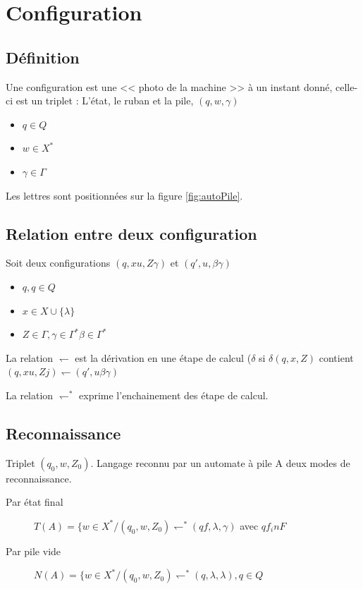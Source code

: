 	\section{Configuration}
	\subsection{Définition}
	Une configuration est une << photo de la machine >> à un instant donné, celle-ci est un triplet : L'état, le ruban et la pile, $(q, w, \gamma)$
	\begin{itemize}
		\item $q\in Q$
		\item $w \in X^*$
		\item $\gamma \in \Gamma$
	\end{itemize}

	Les lettres sont positionnées sur la figure \ref{fig:autoPile}.

	\subsection{Relation entre deux configuration}
	Soit deux configurations $(q,xu,Z\gamma)$ et $(q',u,\beta\gamma)$

	\begin{itemize}
		\item $q,q\in Q$
		\item $x \in X \cup\{\lambda\}$
		\item $Z \in \Gamma, \gamma \in\Gamma^*\beta \in\Gamma^*$
	\end{itemize}

\begin{definition}
	La relation $\leftharpoondown$ est la dérivation en une étape de calcul ($\delta$ si $\delta(q,x,Z)$ contient $(q,xu,Zj) \leftharpoondown (q',u\beta
	\gamma)$
\end{definition}

\begin{definition}
	La relation $\leftharpoondown^*$ exprime l'enchainement des étape de calcul.
\end{definition}

\subsection{Reconnaissance}
Triplet $(q_0,w,Z_0)$. Langage reconnu par un automate à pile A deux modes de reconnaissance.
\begin{description}
	\item[Par état final]$T(A) = \{w\in X^*/(q_0,w,Z_0)\leftharpoondown^*(qf,\lambda,\gamma)$ avec $qf _in F$
	\item[Par pile vide] $N(A) = \{w\in X^*/(q_0,w,Z_0)\leftharpoondown^*(q,\lambda,\lambda),q \in Q$
\end{description}

